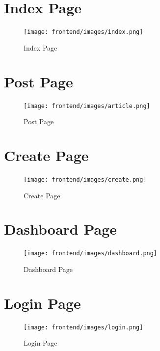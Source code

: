 \documentclass{article}
\begin{document}
\noindent \section{Index Page}

\begin{figure}[h]
\centering
\texttt{[image: frontend/images/index.png]}
\caption{Index Page}
\end{figure}

\noindent 
\newpage

\noindent \section{Post Page}

\begin{figure}[h]
\centering
\texttt{[image: frontend/images/article.png]}
\caption{Post Page}
\end{figure}

\noindent 
\newpage

\noindent \section{Create Page }

\begin{figure}[h]
\centering
\texttt{[image: frontend/images/create.png]}
\caption{Create Page}
\end{figure}

\noindent 
\newpage

\noindent \section{Dashboard Page }

\begin{figure}[h]
\centering
\texttt{[image: frontend/images/dashboard.png]}
\caption{Dashboard Page}
\end{figure}

\noindent 
\newpage

\noindent \section{Login Page }

\begin{figure}[h]
\centering
\texttt{[image: frontend/images/login.png]}
\caption{Login Page}
\end{figure}

\noindent 
\newpage
\end{document}
